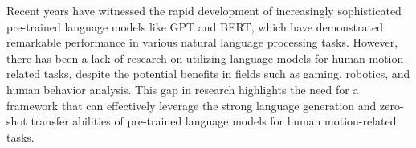 Recent years have witnessed the rapid development of increasingly sophisticated pre-trained language models like GPT and BERT, which have demonstrated remarkable performance in various natural language processing tasks. 
However, there has been a lack of research on utilizing language models for human motion-related tasks, despite the potential benefits in fields such as gaming, robotics, and human behavior analysis. 
This gap in research highlights the need for a framework that can effectively leverage the strong language generation and zero-shot transfer abilities of pre-trained language models for human motion-related tasks.
